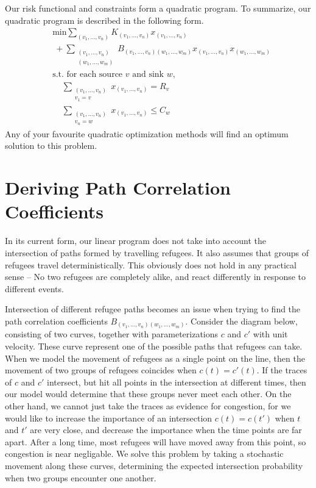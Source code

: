 \documentclass{article}
\begin{document}
Our risk functional and constraints form a quadratic program. To summarize, our quadratic program is described in the following form.
%
\begin{align*}
    &\text{min} \sum_{(v_1, \dots, v_n)} K_{(v_1, \dots, v_n)} x_{(v_1, \dots, v_n)}\\
    & \ + \sum_{\substack{(v_1, \dots, v_n)\\(w_1, \dots, w_m)}} B_{(v_1, \dots, v_n) (w_1, \dots, w_m)} x_{(v_1, \dots, v_n)} x_{(w_1, \dots, w_m)}\\
    &\text{s.t. for each source $v$ and sink $w$,}\\
    &\ \ \ \ \ \sum_{\substack{(v_1, \dots, v_n) \\ v_1 = v}} x_{(v_1, \dots, v_n)} = R_v\\
    &\ \ \ \ \ \sum_{\substack{(v_1, \dots, v_n) \\ v_n = w}} x_{(v_1, \dots, v_n)} \leq C_w
\end{align*}
%
Any of your favourite quadratic optimization methods will find an optimum solution to this problem.

\section{Deriving Path Correlation Coefficients}

In its current form, our linear program does not take into account the intersection of paths formed by travelling refugees. It also assumes that groups of refugees travel deterministically. This obviously does not hold in any practical sense -- No two refugees are completely alike, and react differently in response to different events.

Intersection of different refugee paths becomes an issue when trying to find the path correlation coefficients $B_{(v_1, \dots, v_n) (w_1, \dots, w_m)}$. Consider the diagram below, consisting of two curves, together with parameterizations $c$ and $c'$ with unit velocity. These curve represent one of the possible paths that refugees can take. When we model the movement of refugees as a single point on the line, then the movement of two groups of refugees coincides when $c(t) = c'(t)$. If the traces of $c$ and $c'$ intersect, but hit all points in the intersection at different times, then our model would determine that these groups never meet each other. On the other hand, we cannot just take the traces as evidence for congestion, for we would like to increase the importance of an intersection $c(t) = c(t')$ when $t$ and $t'$ are very close, and decrease the importance when the time points are far apart. After a long time, most refugees will have moved away from this point, so congestion is near negligable. We solve this problem by taking a stochastic movement along these curves, determining the expected intersection probability when two groups encounter one another.
\end{document}
